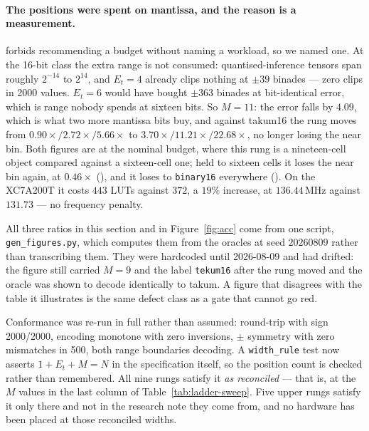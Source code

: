 \paragraph{The positions were spent on mantissa, and the reason is a measurement.}
 forbids recommending a budget without naming a workload,
so we named one. At the 16-bit class the extra range is not consumed:
quantised-inference tensors span roughly $2^{-14}$ to $2^{14}$, and $E_t = 4$
already clips nothing at $\pm 39$ binades --- zero clips in 2000 values. $E_t = 6$
would have bought $\pm 363$ binades at bit-identical error, which is range nobody
spends at sixteen bits. So $M = 11$: the error falls by $4.09$, which is what two
more mantissa bits buy, and against takum16 the rung moves from
$0.90\times / 2.72\times / 5.66\times$ to $3.70\times / 11.21\times / 22.68\times$,
no longer losing the near bin. Both figures are at the nominal budget, where this
rung is a nineteen-cell object compared against a sixteen-cell one; held to
sixteen cells it loses the near bin again, at $0.46\times$
(), and it loses to \texttt{binary16} everywhere
(). On the XC7A200T it costs $443$ LUTs against $372$,
a $19\%$ increase, at $136.44$\,MHz against $131.73$ --- no frequency penalty.

All three ratios in this section and in Figure~\ref{fig:acc} come from one
script, \texttt{gen\_figures.py}, which computes them from the oracles at seed
$20260809$ rather than transcribing them. They were hardcoded until 2026-08-09 and
had drifted: the figure still carried $M = 9$ and the label \texttt{tekum16} after
the rung moved and the oracle was shown to decode identically to takum. A figure
that disagrees with the table it illustrates is the same defect class as a gate
that cannot go red.

Conformance was re-run in full rather than assumed: round-trip with sign
2000/2000, encoding monotone with zero inversions, $\pm$ symmetry with zero
mismatches in 500, both range boundaries decoding. A \texttt{width\_rule} test now
asserts $1 + E_t + M = N$ in the specification itself, so the position count is
checked rather than remembered. All nine rungs satisfy it \emph{as reconciled} ---
that is, at the $M$ values in the last column of Table~\ref{tab:ladder-sweep}. Five
upper rungs satisfy it only there and not in the research note they come from, and
no hardware has been placed at those reconciled widths.



